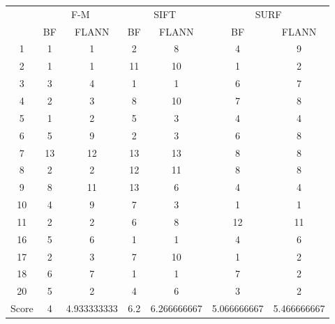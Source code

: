 \documentclass[draft,final]{vutinfth} %
\begin{document}
\begin{minipage}{\linewidth}
\centering
\begin{tabular}{ccccccc}
\multirow{2}{*}{ } & \multicolumn{2}{c}{ F-M } & \multicolumn{2}{c}{ SIFT } & \multicolumn{2}{c}{ SURF } \\
& BF & FLANN & BF & FLANN & BF & FLANN \\
1 & 1 & 1 & 2 & 8 & 4 & 9 \\
2 & 1 & 1 & 11 & 10 & 1 & 2 \\
3 & 3 & 4 & 1 & 1 & 6 & 7 \\
4 & 2 & 3 & 8 & 10 & 7 & 8 \\
5 & 1 & 2 & 5 & 3 & 4 & 4 \\
6 & 5 & 9 & 2 & 3 & 6 & 8 \\
7 & 13 & 12 & 13 & 13 & 8 & 8 \\
8 & 2 & 2 & 12 & 11 & 8 & 8 \\
9 & 8 & 11 & 13 & 6 & 4 & 4 \\
10 & 4 & 9 & 7 & 3 & 1 & 1 \\
11 & 2 & 2 & 6 & 8 & 12 & 11 \\
16 & 5 & 6 & 1 & 1 & 4 & 6 \\
17 & 2 & 3 & 7 & 10 & 1 & 2 \\
18 & 6 & 7 & 1 & 1 & 7 & 2 \\
20 & 5 & 2 & 4 & 6 & 3 & 2 \\
Score & 4 & 4.933333333 & 6.2 & 6.266666667 & 5.066666667 & 5.466666667 \\
\end{tabular}
 \label{tab:25Mean} 
\end{minipage}
\end{document}
